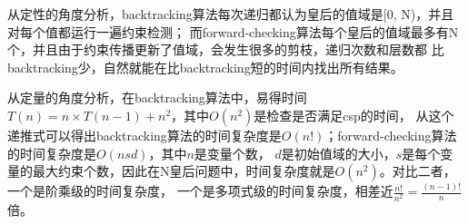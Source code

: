 \documentclass[10pt,letterpaper]{ctexart}
\begin{document}
\par 从定性的角度分析，backtracking算法每次递归都认为皇后的值域是[0, N)，并且对每个值都运行一遍约束检测；
而forward-checking算法每个皇后的值域最多有N个，并且由于约束传播更新了值域，会发生很多的剪枝，递归次数和层数都
比backtracking少，自然就能在比backtracking短的时间内找出所有结果。
\par 从定量的角度分析，在backtracking算法中，易得时间$T(n) = n\times T(n-1) + n^2$，其中$O(n^2)$是检查是否满足csp的时间，
从这个递推式可以得出backtracking算法的时间复杂度是$O(n!)$；forward-checking算法的时间复杂度是$O(nsd)$，其中$n$是变量个数，
$d$是初始值域的大小，$s$是每个变量的最大约束个数，因此在N皇后问题中，时间复杂度就是$O(n^2)$。对比二者，一个是阶乘级的时间复杂度，
一个是多项式级的时间复杂度，相差近$\frac{n!}{n^2}=\frac{(n-1)!}{n}$倍。
\end{document}
